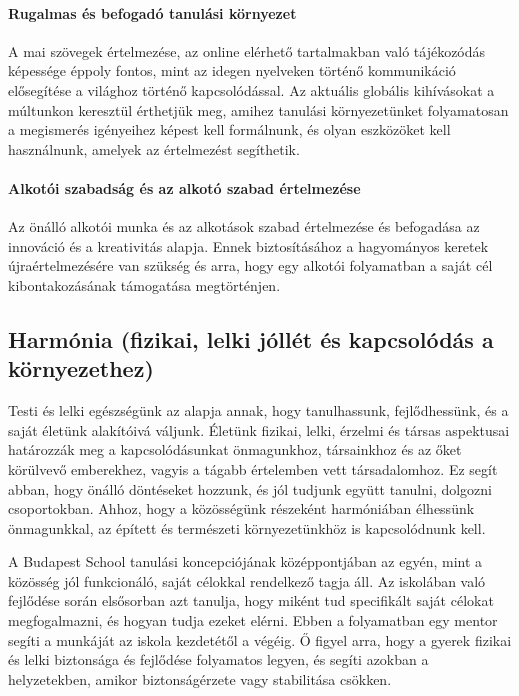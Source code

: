 \hypertarget{rugalmas-es-befogado-tanulasi-kornyezet}{%
\paragraph{Rugalmas és befogadó tanulási
környezet}\label{rugalmas-es-befogado-tanulasi-kornyezet}}

A mai szövegek értelmezése, az online elérhető tartalmakban való
tájékozódás képessége éppoly fontos, mint az idegen nyelveken történő
kommunikáció elősegítése a világhoz történő kapcsolódással. Az aktuális
globális kihívásokat a múltunkon keresztül érthetjük meg, amihez
tanulási környezetünket folyamatosan a megismerés igényeihez képest kell
formálnunk, és olyan eszközöket kell használnunk, amelyek az értelmezést
segíthetik.

\hypertarget{alkotoi-szabadsag-es-az-alkoto-szabad-ertelmezese}{%
\paragraph{Alkotói szabadság és az alkotó szabad
értelmezése}\label{alkotoi-szabadsag-es-az-alkoto-szabad-ertelmezese}}

Az önálló alkotói munka és az alkotások szabad értelmezése és befogadása
az innováció és a kreativitás alapja. Ennek biztosításához a hagyományos
keretek újraértelmezésére van szükség és arra, hogy egy alkotói
folyamatban a saját cél kibontakozásának támogatása megtörténjen.

\hypertarget{harmonia-fizikai-lelki-jollet-es-kapcsolodas-a-kornyezethez}{%
\subsection{Harmónia (fizikai, lelki jóllét és kapcsolódás a
környezethez)}\label{harmonia-fizikai-lelki-jollet-es-kapcsolodas-a-kornyezethez}}

Testi és lelki egészségünk az alapja annak, hogy tanulhassunk,
fejlődhessünk, és a saját életünk alakítóivá váljunk. Életünk fizikai,
lelki, érzelmi és társas aspektusai határozzák meg a kapcsolódásunkat
önmagunkhoz, társainkhoz és az őket körülvevő emberekhez, vagyis a
tágabb értelemben vett társadalomhoz. Ez segít abban, hogy önálló
döntéseket hozzunk, és jól tudjunk együtt tanulni, dolgozni
csoportokban. Ahhoz, hogy a közösségünk részeként harmóniában élhessünk
önmagunkkal, az épített és természeti környezetünkhöz is kapcsolódnunk
kell.

A Budapest School tanulási koncepciójának középpontjában az egyén, mint
a közösség jól funkcionáló, saját célokkal rendelkező tagja áll. Az
iskolában való fejlődése során elsősorban azt tanulja, hogy miként tud
specifikált saját célokat megfogalmazni, és hogyan tudja ezeket elérni.
Ebben a folyamatban egy mentor segíti a munkáját az iskola kezdetétől a
végéig. Ő figyel arra, hogy a gyerek fizikai és lelki biztonsága és
fejlődése folyamatos legyen, és segíti azokban a helyzetekben, amikor
biztonságérzete vagy stabilitása csökken.

